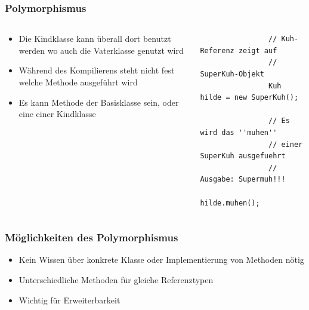 \begin{frame}[fragile] 
	\frametitle{Polymorphismus} 
	\begin{columns}
		\begin{column}{0.5\textwidth}
			\begin{itemize}
			  \item Die Kindklasse kann \"uberall dort benutzt 
			  werden wo auch die Vaterklasse genutzt wird
			  \item W\"ahrend des Kompilierens steht nicht fest
			  welche Methode ausgef\"uhrt wird
			  \item Es kann Methode der Basisklasse sein, oder eine
			  einer Kindklasse
			\end{itemize}
		\end{column}
		\begin{column}{0.5\textwidth}
			\begin{lstlisting}
				// Kuh-Referenz zeigt auf 
				// SuperKuh-Objekt
				Kuh hilde = new SuperKuh();
				
				// Es wird das ''muhen''
				// einer SuperKuh ausgefuehrt
				// Ausgabe: Supermuh!!!
				hilde.muhen();
			\end{lstlisting}
		\end{column}
	\end{columns}
\end{frame}

\begin{frame}[fragile]
	\frametitle{M\"oglichkeiten des Polymorphismus}
		\begin{itemize}
		  \item Kein Wissen \"uber konkrete Klasse oder
		  Implementierung von Methoden n\"otig
		  \item Unterschiedliche Methoden f\"ur gleiche
		  Referenztypen
		  \item Wichtig f\"ur Erweiterbarkeit
		\end{itemize}
\end{frame}

